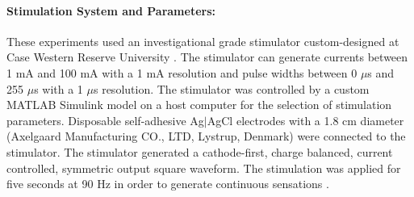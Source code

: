 \documentclass[10pt]{iopart}
\begin{document}
\paragraph{Stimulation System and Parameters:}These experiments used an investigational grade stimulator custom-designed at Case Western Reserve University \cite{trier_modular_2001}. The stimulator can generate currents between 1 mA and 100 mA with a 1 mA resolution and pulse widths between 0 $\mu$s and 255 $\mu$s with a 1 $\mu$s resolution. The stimulator was controlled by a custom MATLAB Simulink model on a host computer for the selection of stimulation parameters. Disposable self-adhesive Ag$|$AgCl electrodes with a 1.8 cm diameter (Axelgaard Manufacturing CO., LTD, Lystrup, Denmark) were connected to the stimulator. The stimulator generated a cathode-first, charge balanced, current controlled, symmetric output square waveform. The stimulation was applied for five seconds at 90 Hz in order to generate continuous sensations \cite{graczyk_frequency_2022}. 
\end{document}
